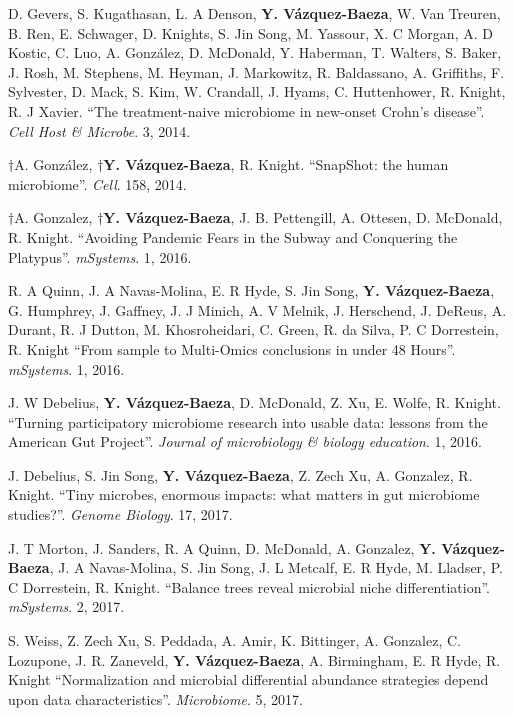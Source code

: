 \begin{frontmatter}
\begin{vitapage}
\begin{publications}
    \item D. Gevers, S. Kugathasan, L. A Denson, \textbf{Y. V\'azquez-Baeza}, W. Van Treuren, B. Ren, E. Schwager, D. Knights, S. Jin Song, M. Yassour, X. C Morgan, A. D Kostic, C. Luo, A. González, D. McDonald, Y. Haberman, T. Walters, S. Baker, J. Rosh, M. Stephens, M. Heyman, J. Markowitz, R. Baldassano, A. Griffiths, F. Sylvester, D. Mack, S. Kim, W. Crandall, J. Hyams, C. Huttenhower, R. Knight, R. J Xavier. ``The treatment-naive microbiome in new-onset Crohn's disease''. \emph{Cell Host \& Microbe}. 3, 2014.

    \item $\dagger$A. Gonz\'alez, \textbf{$\dagger$Y. V\'azquez-Baeza}, R. Knight. ``SnapShot: the human microbiome''. \emph{Cell}. 158, 2014.

    \item $\dagger$A. Gonzalez, \textbf{$\dagger$Y. V\'azquez-Baeza},  J. B. Pettengill, A. Ottesen, D. McDonald, R. Knight. ``Avoiding Pandemic Fears in the Subway and Conquering the Platypus''. \emph{mSystems}. 1, 2016.

    \item R. A Quinn, J. A Navas-Molina, E. R Hyde, S. Jin Song, \textbf{Y. V\'azquez-Baeza}, G. Humphrey, J. Gaffney, J. J Minich, A. V Melnik, J. Herschend, J. DeReus, A. Durant, R. J Dutton, M. Khosroheidari, C. Green, R. da Silva, P. C Dorrestein, R. Knight ``From sample to Multi-Omics conclusions in under 48 Hours''. \emph{mSystems}. 1, 2016.

    \item J. W Debelius, \textbf{Y. V\'azquez-Baeza}, D. McDonald, Z. Xu, E. Wolfe, R. Knight. ``Turning participatory microbiome research into usable data: lessons from the American Gut Project''. \emph{Journal of microbiology \& biology education}. 1, 2016.

    \item J. Debelius, S. Jin Song, \textbf{Y. V\'azquez-Baeza}, Z. Zech Xu, A. Gonzalez, R. Knight. ``Tiny microbes, enormous impacts: what matters in gut microbiome studies?''. \emph{Genome Biology}. 17, 2017.

    \item J. T Morton, J. Sanders, R. A Quinn, D. McDonald, A. Gonzalez, \textbf{Y. V\'azquez-Baeza}, J. A Navas-Molina, S. Jin Song, J. L Metcalf, E. R Hyde, M. Lladser, P. C Dorrestein, R. Knight. ``Balance trees reveal microbial niche differentiation''. \emph{mSystems}. 2, 2017.

    \item S. Weiss, Z. Zech Xu, S. Peddada, A. Amir, K. Bittinger, A. Gonzalez, C. Lozupone, J. R. Zaneveld, \textbf{Y. V\'azquez-Baeza}, A. Birmingham, E. R Hyde, R. Knight ``Normalization and microbial differential abundance strategies depend upon data characteristics''. \emph{Microbiome}. 5, 2017.


\end{publications}
\end{vitapage}
\end{frontmatter}
